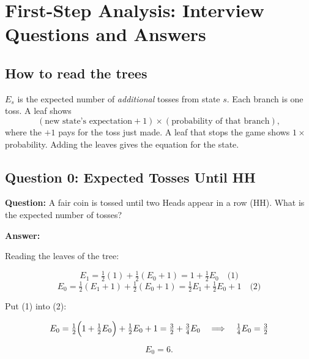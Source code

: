 \documentclass{article}
\begin{document}
\section*{First-Step Analysis: Interview Questions and Answers}

\subsection*{How to read the trees}

$E_s$ is the expected number of \emph{additional} tosses from state $s$.
Each branch is one toss. A leaf shows
\[
(\text{new state's expectation} + 1)\times(\text{probability of that branch}),
\]
where the $+1$ pays for the toss just made. A leaf that stops the game shows $1\times$ probability.
Adding the leaves gives the equation for the state.

\subsection*{Question 0: Expected Tosses Until HH}

\textbf{Question:}
A fair coin is tossed until two Heads appear in a row (HH). What is the expected number of tosses?

\begin{center}
\end{center}

\textbf{Answer:}

Reading the leaves of the tree:

\[
E_1=\tfrac12(1)+\tfrac12(E_0+1)=1+\tfrac12E_0 \quad\text{(1)}
\]
\[
E_0=\tfrac12(E_1+1)+\tfrac12(E_0+1)=\tfrac12E_1+\tfrac12E_0+1 \quad\text{(2)}
\]

Put (1) into (2):

\[
E_0=\tfrac12\Bigl(1+\tfrac12E_0\Bigr)+\tfrac12E_0+1
=\tfrac32+\tfrac34E_0
\quad\Longrightarrow\quad
\tfrac14E_0=\tfrac32
\]

\[
\boxed{E_0=6}.
\]
\end{document}
